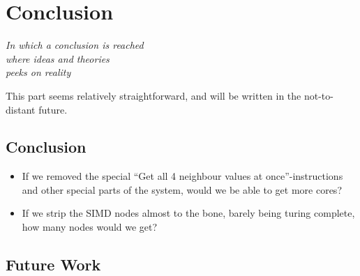 \chapter{Conclusion}\label{ch:conc}

\begin{flushright}{\slshape
    In which a conclusion is reached\\
    where ideas and theories\\
    peeks on reality
}
\end{flushright}

This part seems relatively straightforward, and will be written in the
not-to-distant future.

\section{Conclusion}

\begin{itemize}
\item If we removed the special ``Get all 4 neighbour values at
  once''-instructions and other special parts of the system, would we be able to
  get more cores?
\item If we strip the SIMD nodes almost to the bone, barely being turing
  complete, how many nodes would we get?
\end{itemize}

\section{Future Work}
